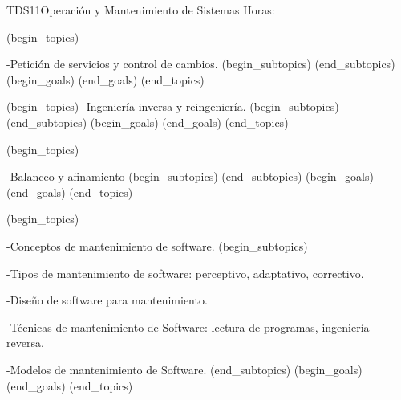 \begin{BKL2}{TDS11}{Operación y Mantenimiento de Sistemas}
Horas:
 
(begin_topics)

-Petición de servicios y control de cambios.
(begin_subtopics)
(end_subtopics)
(begin_goals)
(end_goals)
(end_topics)

 

(begin_topics)
-Ingeniería inversa y reingeniería.
(begin_subtopics)
(end_subtopics)
(begin_goals)
(end_goals)
(end_topics)

 

(begin_topics)

-Balanceo y afinamiento
(begin_subtopics)
(end_subtopics)
(begin_goals)
(end_goals)
(end_topics)

 

(begin_topics)

-Conceptos de mantenimiento de software.
(begin_subtopics)

-Tipos de mantenimiento de software: perceptivo, adaptativo, correctivo.

-Diseño de software para mantenimiento.

-Técnicas de mantenimiento de Software: lectura de programas, ingeniería reversa.

-Modelos de mantenimiento de Software.
(end_subtopics)
(begin_goals)
(end_goals)
(end_topics)

\end{BKL2}



